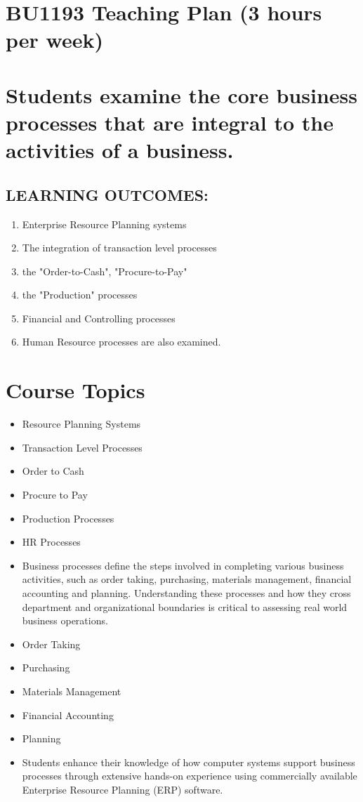 \section * {BU1193 Teaching Plan (3 hours per week)}
\section * {Students examine the core business processes that are integral to the activities of a business. }
\subsection * {LEARNING OUTCOMES:}
\begin{enumerate}
    \item Enterprise Resource Planning systems
    \item The integration of transaction level processes
    \item the "Order-to-Cash", "Procure-to-Pay"
    \item the "Production" processes
    \item Financial and Controlling processes
    \item Human Resource processes are also examined. 
\end{enumerate}

\section{Course Topics}
\begin{itemize}
    \item Resource Planning Systems
    \item   Transaction Level Processes
    \item   Order to Cash
    \item   Procure to Pay
    \item   Production Processes
    \item   HR Processes
    \item  Business processes define the steps involved in completing various business activities, such as order taking, purchasing, materials management, financial accounting and planning. Understanding these processes and how they cross department and organizational boundaries is critical to assessing real world business operations. 
    \item   Order Taking
    \item   Purchasing
    \item   Materials Management
    \item   Financial Accounting
    \item   Planning
    \item Students enhance their knowledge of how computer systems support business processes through extensive hands-on experience using commercially available Enterprise Resource Planning (ERP) software.
\end{itemize}    
    
